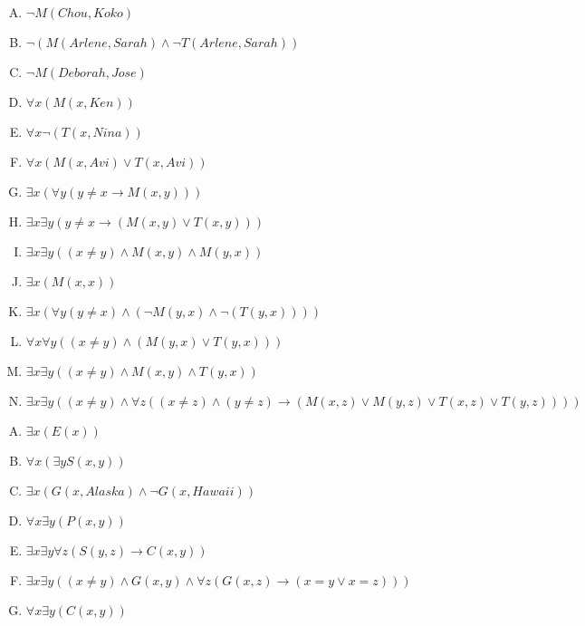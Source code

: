 {{        %
        \begin{practices}
            \begin{enumerate}[A.]
                \item $\neg M(Chou, Koko)$
                \item $\neg (M(Arlene, Sarah) \wedge \neg T(Arlene, Sarah))$
                \item $\neg M(Deborah, Jose)$
                \item $\forall x (M(x, Ken))$
                \item $\forall x \neg (T(x, Nina))$
                \item $\forall x (M(x, Avi) \vee T(x, Avi))$
                \item $\exists x (\forall y (y \neq x \rightarrow M(x, y)))$
                \item $\exists x \exists y (y \neq x \rightarrow (M(x, y) \vee T(x, y)))$
                \item $\exists x \exists y ((x \neq y) \wedge M(x, y) \wedge M(y, x))$
                \item $\exists x (M(x, x))$
                \item $\exists x (\forall y (y \neq x) \wedge (\neg M(y, x) \wedge \neg (T(y, x))))$
                \item $\forall x \forall y ((x \neq y) \wedge (M(y, x) \vee T(y, x)))$
                \item $\exists x \exists y ((x \neq y) \wedge M(x, y) \wedge T(y, x))$
                \item $\exists x \exists y ((x \neq y) \wedge \forall z ((x \neq z) \wedge (y \neq z) \rightarrow (M(x, z) \vee M(y, z) \vee T(x, z) \vee T(y, z))))$
            \end{enumerate}
        \end{practices}

        \begin{practices}
            \begin{enumerate}[A.]
                \item $\exists x (E(x))$
                \item $\forall x (\exists y S(x, y))$
                \item $\exists x (G(x, Alaska) \wedge \neg G(x, Hawaii))$
                \item $\forall x \exists y (P(x, y))$
                \item $\exists x \exists y \forall z (S(y, z) \rightarrow C(x, y))$
                \item $\exists x \exists y ((x \neq y) \wedge G(x, y) \wedge \forall z (G(x, z) \rightarrow (x = y \vee x = z)))$
                \item $\forall x \exists y (C(x, y))$
            \end{enumerate}
        \end{practices}

}}

